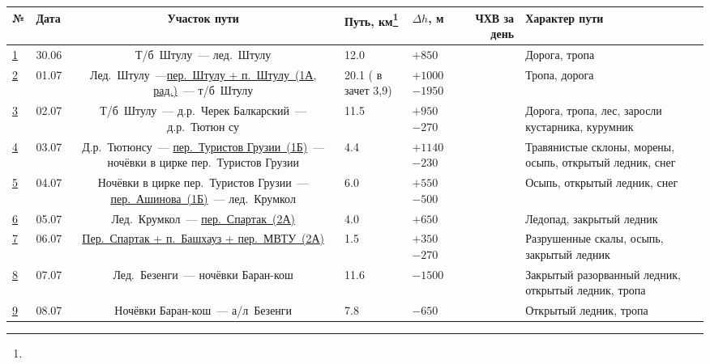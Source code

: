 		{\footnotesize
		\begin{longtable}{|A|B|C|F|K|D|E|} \hline
			№							&	Дата 		&	Участок пути																																																&	Путь, км\footnote{\textOne}	&	$\Delta h$, м		&	ЧХВ	за день	&	Характер пути																\\ \hline
			\hyperref[subsec:Day1]{1}	&	30.06	&	Т/б~Штулу~--- лед.~Штулу																																													&	12.0						&	$+850$ 			&			&	Дорога, тропа																\\ \hline
			\hyperref[subsec:Day2]{2}	&	01.07	&	Лед.~Штулу~---\hyperref[subsec:main_obstacles]{пер.~Штулу + п.~Штулу~(1А, рад.)}~--- т/б~Штулу																											&	20.1 ( в зачет 3,9)						&	$+1000$ $-1950$			&			&	Тропа, дорога																\\ \hline
			\hyperref[subsec:Day3]{3}	&	02.07	&	Т/б~Штулу~--- д.р.~Черек Балкарский~--- д.р.~Тютюн	су																																						&	11.5						&	$+950$ $-270$			&			&	Дорога, тропа, лес, заросли кустарника, курумник							\\ \hline
			\hyperref[subsec:Day4]{4}	&	03.07	&	Д.р.~Тютюнсу~--- \hyperref[subsec:main_obstacles]{пер.~Туристов Грузии~(1Б)}~--- ночёвки в цирке пер.~Туристов Грузии																						&	4.4							&	$+1140$ $-230$ 			&			&	Травянистые склоны, морены, осыпь, открытый ледник, снег					\\ \hline
			\hyperref[subsec:Day5]{5}	&	04.07	&	Ночёвки в цирке пер.~Туристов Грузии~--- \hyperref[subsec:main_obstacles]{пер.~Ашинова~(1Б)}~--- лед.~Крумкол																								&	6.0							&	$+550$ $-500$ 			&			&	Осыпь, открытый ледник, снег												\\ \hline
			\hyperref[subsec:Day6]{6}	&	05.07	&	Лед.~Крумкол~--- \hyperref[subsec:main_obstacles]{пер.~Спартак~(2А)}																																		&	4.0							&	$+650$ 			 		&			&	Ледопад, закрытый ледник													\\ \hline
			\hyperref[subsec:Day7]{7}	&	06.07	&	\hyperref[subsec:main_obstacles]{Пер.~Спартак + п.~Башхауз + пер.~МВТУ~(2А)}																																&	1.5							&	$+350$ $-270$	 		&			&	Разрушенные скалы, осыпь, закрытый ледник									\\ \hline
			\hyperref[subsec:Day8]{8}	&	07.07	&	Лед.~Безенги~--- ночёвки Баран-кош																																											&	11.6						&	 $-1500$	 		&			&	Закрытый разорванный ледник, открытый ледник, тропа							\\ \hline
			\hyperref[subsec:Day9]{9}	&	08.07	&	Ночёвки Баран-кош~--- а/л~Безенги																																											&	7.8							&	 $-650$	 		&			&	Открытый ледник, тропа														\\ \hline

\end{longtable}}
